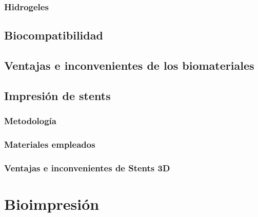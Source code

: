\documentclass[a4paper,12pt]{article}
\begin{document}
\subsubsection{Hidrogeles}

\subsection{Biocompatibilidad}

\subsection{Ventajas e inconvenientes de los biomateriales}

\subsection{Impresión de stents}

\subsubsection{Metodología}

\subsubsection{Materiales empleados}

\subsubsection{Ventajas e inconvenientes de Stents 3D}

\pagebreak
\section{Bioimpresión}
\end{document}
